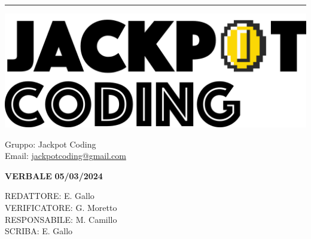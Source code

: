 \documentclass[5pt]{article}
\begin{document}
\hrule
\begin{minipage}[t]{0.50\textwidth}
    \begin{flushleft}
        \hspace{10pt}
        \includegraphics[scale=0.65]{jackpot-logo.png} 
    \end{flushleft}
\end{minipage}
\hspace{-60pt} %
\begin{flushright}
    \begin{minipage}[t]{0.50\textwidth}
        \begin{flushright}
            Gruppo: {\Large Jackpot Coding}\\
            Email: \href{mailto:jackpotcoding@gmail.com}{jackpotcoding@gmail.com}
        \end{flushright}
    \end{minipage}
\end{flushright}

\vspace{15pt}

\begin{center}
    \textbf{\large VERBALE }
    \textbf{\large 05/03/2024} \\
    \textbf{\Large}
\end{center}

\vspace{13pt}

\begin{flushleft}
    \begin{spacing}{1.5}
        REDATTORE:  E. Gallo \\
        VERIFICATORE:  G. Moretto\\%
        RESPONSABILE: M. Camillo \\%
        \vspace{7pt}
        SCRIBA: E. Gallo\\%
    \end{spacing}
\end{flushleft}
\end{document}
